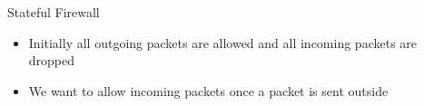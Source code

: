 \begin{frame}{Stateful Firewall}
    \begin{center}
    \end{center}
    \begin{itemize}
        \item Initially all outgoing packets are allowed and all incoming packets are dropped
        \item We want to allow incoming packets once a packet is sent outside
    \end{itemize}
\end{frame}

